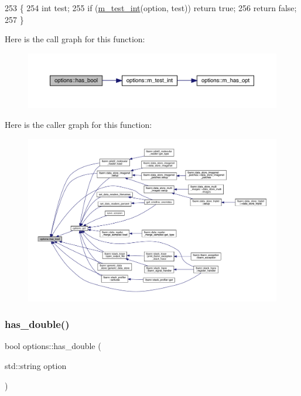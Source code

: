 \begin{DoxyCode}
253 \{
254   \textcolor{keywordtype}{int} test;
255   \textcolor{keywordflow}{if} (\hyperlink{classoptions_ad9b4461e633b73acc2fde7752ef60d41}{m\_test\_int}(option, test)) \textcolor{keywordflow}{return} \textcolor{keyword}{true};
256   \textcolor{keywordflow}{return} \textcolor{keyword}{false};
257 \}
\end{DoxyCode}
Here is the call graph for this function\+:\nopagebreak
\begin{figure}[H]
\begin{center}
\leavevmode
\includegraphics[width=350pt]{classoptions_aafb1d2a7ccde0b1bf786230ba4080ecd_cgraph}
\end{center}
\end{figure}
Here is the caller graph for this function\+:\nopagebreak
\begin{figure}[H]
\begin{center}
\leavevmode
\includegraphics[width=350pt]{classoptions_aafb1d2a7ccde0b1bf786230ba4080ecd_icgraph}
\end{center}
\end{figure}
\mbox{\label{classoptions_ab66aae6c79cdde8dd38d0d3fc8aa3de5}} 
\subsubsection{\texorpdfstring{has\+\_\+double()}{has\_double()}}
{\footnotesize\ttfamily bool options\+::has\+\_\+double (\begin{DoxyParamCaption}\item[{std\+::string}]{option }\end{DoxyParamCaption})}



